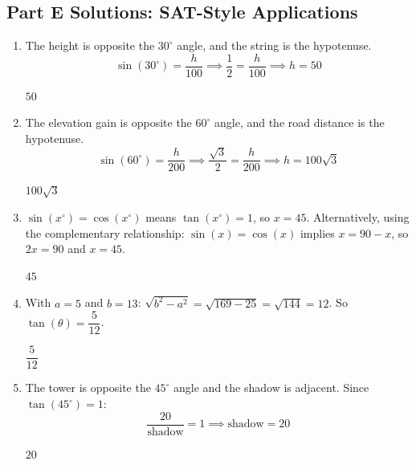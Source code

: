 \documentclass[14pt]{extarticle}
\begin{document}
\subsection*{Part E Solutions: SAT-Style Applications}
\begin{enumerate}
  \item The height is opposite the \(30^\circ\) angle, and the string is the hypotenuse.
  \[
  \sin(30^\circ) = \frac{h}{100} \implies \frac{1}{2} = \frac{h}{100} \implies h = 50
  \]

  \(\boxed{50}\)

  \item The elevation gain is opposite the \(60^\circ\) angle, and the road distance is the hypotenuse.
  \[
  \sin(60^\circ) = \frac{h}{200} \implies \frac{\sqrt{3}}{2} = \frac{h}{200} \implies h = 100\sqrt{3}
  \]

  \(\boxed{100\sqrt{3}}\)

  \item \(\sin(x^\circ) = \cos(x^\circ)\) means \(\tan(x^\circ) = 1\), so \(x = 45\). Alternatively, using the complementary relationship: \(\sin(x) = \cos(x)\) implies \(x = 90 - x\), so \(2x = 90\) and \(x = 45\).

  \(\boxed{45}\)

  \item With \(a = 5\) and \(b = 13\): \(\sqrt{b^2 - a^2} = \sqrt{169 - 25} = \sqrt{144} = 12\). So \(\tan(\theta) = \dfrac{5}{12}\).

  \(\boxed{\dfrac{5}{12}}\)

  \item The tower is opposite the \(45^\circ\) angle and the shadow is adjacent. Since \(\tan(45^\circ) = 1\):
  \[
  \frac{20}{\text{shadow}} = 1 \implies \text{shadow} = 20
  \]

  \(\boxed{20}\)
\end{enumerate}

\end{document}
